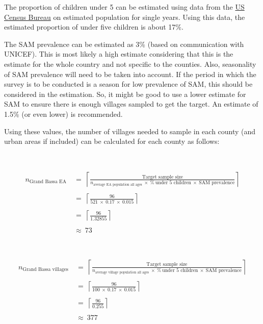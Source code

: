 \documentclass[12pt,a4paper]{book}
\theoremstyle{definition}
\theoremstyle{definition}
\theoremstyle{definition}
\theoremstyle{remark}
\begin{document}
The proportion of children under 5 can be estimated using data from the
\href{https://www.census.gov/data-tools/demo/idb/region.php?N=\%20Results\%20\&T=15\&A=separate\&RT=0\&Y=2018\&R=-1\&C=LI}{US
Census Bureau} on estimated population for single years. Using this
data, the estimated proportion of under five children is about 17\%.

The SAM prevalence can be estimated as 3\% (based on communication with
UNICEF). This is most likely a high estimate considering that this is
the estimate for the whole country and not specific to the counties.
Also, seasonality of SAM prevalence will need to be taken into account.
If the period in which the survey is to be conducted is a season for low
prevalence of SAM, this should be considered in the estimation. So, it
might be good to use a lower estimate for SAM to ensure there is enough
villages sampled to get the target. An estimate of 1.5\% (or even lower)
is recommended.

Using these values, the number of villages needed to sample in each
county (and urban areas if included) can be calculated for each county
as follows:

~

\[\begin{aligned} 
n_{\text{Grand Bassa EA}} & ~ = ~ \left \lceil \frac{\text{Target sample size}}{n_{\text{average EA population all ages}} ~ \times ~ \% ~ \text{under 5 children} ~ \times ~ \text{SAM prevalence}} \right \rceil \\
\\
& ~ = ~ \left \lceil \frac{96}{521 ~ \times ~ 0.17 ~ \times ~ 0.015} \right \rceil \\
\\
& ~ = ~ \left \lceil \frac{96}{1.32855} \right \rceil \\
\\
& ~ \approx ~ 73
\end{aligned}\]

~

\[\begin{aligned} 
n_{\text{Grand Bassa villages}} & ~ = ~ \left \lceil \frac{\text{Target sample size}}{n_{\text{average village population all ages}} ~ \times ~ \% ~ \text{under 5 children} ~ \times ~ \text{SAM prevalence}} \right \rceil \\
\\
& ~ = ~ \left \lceil \frac{96}{100 ~ \times ~ 0.17 ~ \times ~ 0.015} \right \rceil \\
\\
& ~ = ~ \left \lceil \frac{96}{0.255} \right \rceil \\
\\
& ~ \approx ~ 377
\end{aligned}\]
\end{document}
